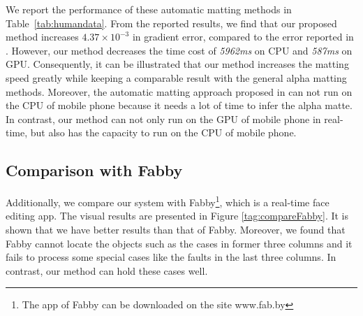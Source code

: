 \documentclass[sigconf]{acmart}
\begin{document}
We report the performance of these automatic matting methods in Table~\ref{tab:humandata}. From the reported results, we find that our proposed method increases $4.37\times 10^{-3}$ in gradient error, compared to the error reported in \cite{shen2016deep}. However, our method decreases the time cost of \emph{5962ms} on CPU and \emph{587ms} on GPU. Consequently, it can be illustrated that our method increases the matting speed greatly while keeping a comparable result with the general alpha matting methods. Moreover, the automatic matting approach proposed in \cite{shen2016deep} can not run on the CPU of mobile phone because it needs a lot of time to infer the alpha matte. In contrast, our method can not only run on the GPU of mobile phone in real-time, but also has the capacity to run on the CPU of mobile phone.
\subsection{Comparison with Fabby}
Additionally, we compare our system with Fabby\footnote{The app of Fabby can be downloaded on the site www.fab.by}, which is a real-time face editing app. The visual results are presented in Figure \ref{tag:compareFabby}. It is shown that we have better results than that of Fabby. Moreover, we found that Fabby cannot locate the objects such as the cases in former three columns and it fails to process some special cases like the faults in the last three columns. In contrast, our method can hold these cases well.
\end{document}
